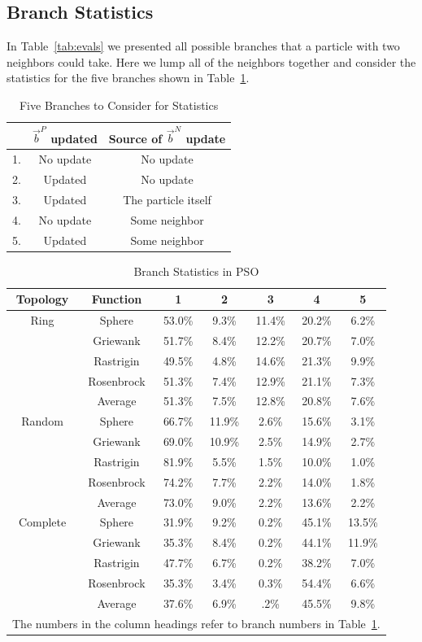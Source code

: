 \documentclass[journal,letterpaper]{IEEEtran}
\providecommand{\pers}{\ensuremath{P}}
\providecommand{\neigh}{\ensuremath{N}}
\providecommand{\nbest}{\ensuremath{\Vec{b}^\neigh}}
\providecommand{\pbest}{\ensuremath{\Vec{b}^\pers}}
\begin{document}
\subsection{Branch Statistics}

In Table~\ref{tab:evals} we presented all possible branches that a particle
with two neighbors could take.  Here we lump all of the neighbors together and
consider the statistics for the five branches shown in Table~\ref{tab:branches}.

\begin{table}[ht]
  \caption{Five Branches to Consider for Statistics}
  \label{tab:branches}
  \centering
  \begin{tabular}{rc|c}
	&$\pbest$ updated&Source of $\nbest$ update\\
	\hline
	1.&No update&No update\\
	2.&Updated&No update\\
	3.&Updated&The particle itself\\
	4.&No update&Some neighbor\\
	5.&Updated&Some neighbor\\
  \end{tabular}
\end{table}

\begin{table}[ht]
  \caption{Branch Statistics in PSO}
  \label{tab:stats}
  \centering
  \begin{tabular}{c|c|c|c|c|c|c}
	Topology&Function&1&2&3&4&5\\
	\hline
	\hline
	Ring&Sphere&53.0\%&9.3\%&11.4\%&20.2\%&6.2\%\\
	&Griewank&51.7\%&8.4\%&12.2\%&20.7\%&7.0\%\\
	&Rastrigin&49.5\%&4.8\%&14.6\%&21.3\%&9.9\%\\
	&Rosenbrock&51.3\%&7.4\%&12.9\%&21.1\%&7.3\%\\
	\cline{2-7}
	&Average&{51.3\%}&{7.5\%}&{12.8\%}&{20.8\%}&
	{7.6\%}\\
	\hline
	\hline
	Random&Sphere&66.7\%&11.9\%&2.6\%&15.6\%&3.1\%\\
	&Griewank&69.0\%&10.9\%&2.5\%&14.9\%&2.7\%\\
	&Rastrigin&81.9\%&5.5\%&1.5\%&10.0\%&1.0\%\\
	&Rosenbrock&74.2\%&7.7\%&2.2\%&14.0\%&1.8\%\\
	\cline{2-7}
	&Average&{73.0\%}&{9.0\%}&{2.2\%}&{13.6\%}&
	{2.2\%}\\
	\hline
	\hline
	Complete&Sphere&31.9\%&9.2\%&0.2\%&45.1\%&13.5\%\\
	&Griewank&35.3\%&8.4\%&0.2\%&44.1\%&11.9\%\\
	&Rastrigin&47.7\%&6.7\%&0.2\%&38.2\%&7.0\%\\
	&Rosenbrock&35.3\%&3.4\%&0.3\%&54.4\%&6.6\%\\
	\cline{2-7}
	&Average&{37.6\%}&{6.9\%}&{.2\%}&{45.5\%}&
	{9.8\%}\\
	\hline
	\multicolumn{7}{l}{The numbers in the column headings refer to branch
	numbers in Table~\ref{tab:branches}.}
  \end{tabular}
\end{table}
\end{document}
